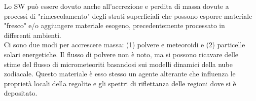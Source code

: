 

Lo SW può essere dovuto anche all'accrezione e perdita di massa dovute a processi di "rimescolamento" degli strati superficiali che possono esporre materiale "fresco" e/o aggiungere materiale esogeno, precedentemente processato in differenti ambienti.\\
Ci sono due modi per accrescere massa: (1) polvere e meteoroidi e (2) particelle solari energetiche. Il flusso di polvere non è noto, ma si possono ricavare delle stime del flusso di micrometeoriti basandosi sui modelli dinamici della nube zodiacale. Questo materiale è esso stesso un agente alterante che influenza le proprietà locali della regolite e gli spettri di riflettanza delle regioni dove si è depositato.\\

